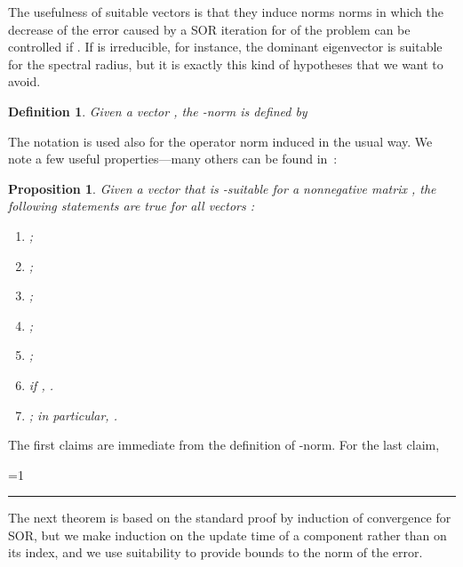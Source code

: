 \documentclass{article}
\newcommand{\1}{\mathbf 1}
\newtheorem{definition}{Definition}
\newtheorem{proposition}{Proposition}
\newcounter{noqed}
\newcommand{\qed}{ \ifmmode\mbox{ }\fi\rule[-.05em]{.3em}{.7em}\setcounter{noqed}{0}}
\newenvironment{proof}[1][{}]{\noindent{\bf Proof#1. }\setcounter{noqed}{1}}{\ifnum\value{noqed}=1\qed\fi\par\medskip}
\begin{document}
The usefulness of suitable vectors is that they induce norms
norms in which the decrease of the error caused by a SOR
iteration for of the problem  can be controlled if
. If  is irreducible, for instance, the dominant eigenvector is suitable
for the spectral radius, but it is exactly this kind of hypotheses that we want to avoid.
\begin{definition}
Given a vector , the -norm is defined by

\end{definition}
The notation  is used also for the operator norm induced
in the usual way.
We note a few useful properties---many others can be found in~\cite{BeTPDCNM}:
\begin{proposition}
\label{prop:wnorm}
Given a vector  that is -suitable for a nonnegative matrix , the
following statements are true for all vectors :
\begin{enumerate}
\item\label{en:coord} ;
\item\label{en:min} ;
\item\label{en:max} ;
\item\label{en:unit} ;
\item\label{en:Aw} ;
\item\label{en:mindef} if , .
\item\label{en:suitable} ; in
particular, .
\end{enumerate}
\end{proposition}
\begin{proof}
The first claims are immediate from the definition of -norm. For the last
claim,

\end{proof}

The next theorem is based on the standard proof by induction of convergence
for SOR, but we make induction on the update time of a component rather than on its index,
and we use suitability to provide bounds to the norm of the error.
\end{document}
